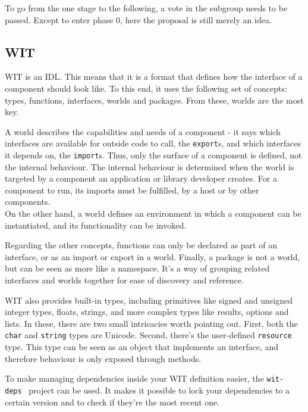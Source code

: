 To go from the one stage to the following, a vote in the subgroup needs to be passed. Except to enter phase 0, here the proposal is still merely an idea.

\subsection{WIT}
\label{sec:wit}

\gls{WIT} is an \gls{IDL}. This means that it is a format that defines how the interface of a component should look like. To this end, it uses the following set of concepts: types, functions, interfaces, worlds and packages. From these, worlds are the most key.

A world describes the capabilities and needs of a component - it says which interfaces are available for outside code to call, the \texttt{export}s, and which interfaces it depends on, the \texttt{import}s. Thus, only the surface of a component is defined, not the internal behaviour. The internal behaviour is determined when the world is targeted by a component an application or library developer creates. For a component to run, its imports must be fulfilled, by a host or by other components. \\
On the other hand, a world defines an environment in which a component can be instantiated, and its functionality can be invoked.

Regarding the other concepts, functions can only be declared as part of an interface, or as an import or export in a world. Finally, a package is not a world, but can be seen as more like a namespace. It's a way of grouping related interfaces and worlds together for ease of discovery and reference.

\gls{WIT} also provides built-in types, including primitives like signed and unsigned integer types, floats, strings, and more complex types like results, options and lists. In these, there are two small intricacies worth pointing out. First, both the \texttt{char} and \texttt{string} types are Unicode. Second, there's the user-defined \texttt{resource} type. This type can be seen as an object that implements an interface, and therefore behaviour is only exposed through methods.


To make managing dependencies inside your \gls{WIT} definition easier, the \texttt{wit-deps}~\cite{gh:wit_deps} project can be used. It makes it possible to lock your dependencies to a certain version and to check if they're the most recent one.


